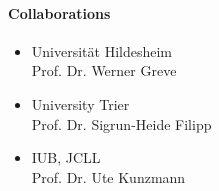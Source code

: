 \paragraph{Collaborations}

\begin{itemize}
\item Universit\"at Hildesheim\\ Prof. Dr. Werner Greve
\item University Trier\\ Prof. Dr. Sigrun-Heide Filipp
\item IUB, JCLL\\ Prof. Dr. Ute Kunzmann
\end{itemize}

\begin{bibunit}[apalike]
\nocite{*}
\putbib[profUrsulaStaudinger4]
\end{bibunit}